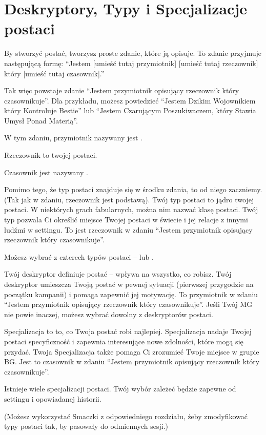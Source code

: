 \section{Deskryptory, Typy i Specjalizacje postaci}

By stworzyć postać, tworzysz proste zdanie, które ją opisuje. To zdanie przyjmuje następującą formę: “Jestem [umieść tutaj przymiotnik] [umieść tutaj rzeczownik] który [umieść tutaj czasownik].”

Tak więc powstaje zdanie “Jestem przymiotnik opisujący rzeczownik który czasownikuje”. Dla przykładu, możesz powiedzieć “Jestem Dzikim Wojownikiem który Kontroluje Bestie” lub “Jestem Czarującym Poszukiwaczem, który Stawia Umysł Ponad Materią”. 

W tym zdaniu, przymiotnik nazywany jest .

Rzeczownik to  twojej postaci.

Czasownik jest nazywany .

Pomimo tego, że typ postaci znajduje się w środku zdania, to od niego zaczniemy. (Tak jak w zdaniu, rzeczownik jest podstawą).
Twój typ postaci to jądro twojej postaci. W niektórych grach fabularnych, można nim nazwać klasę postaci. Twój typ pozwala Ci określić miejsce Twojej postaci w świecie i jej relacje z innymi ludźmi w settingu. To jest rzeczownik w zdaniu “Jestem przymiotnik opisujący rzeczownik który czasownikuje”.

Możesz wybrać z czterech typów postaci –  lub .

Twój deskryptor definiuje postać – wpływa na wszystko, co robisz. Twój deskryptor umieszcza Twoją postać w pewnej sytuacji (pierwszej przygodzie na początku kampanii) i pomaga zapewnić jej motywację. To przymiotnik w zdaniu “Jestem przymiotnik opisujący rzeczownik który czasownikuje”.
Jeśli Twój MG nie powie inaczej, możesz wybrać dowolny z deskryptorów postaci.

Specjalizacja to to, co Twoja postać robi najlepiej. Specjalizacja nadaje Twojej postaci specyficzność i zapewnia interesujące nowe zdolności, które mogą się przydać. Twoja Specjalizacja także pomaga Ci zrozumieć Twoje miejsce w grupie BG. Jest to czasownik w zdaniu “Jestem przymiotnik opisujący rzeczownik który czasownikuje”.

Istnieje wiele specjalizacji postaci. Twój wybór zależeć będzie zapewne od settingu i opowiadanej historii.

(Możesz wykorzystać Smaczki z odpowiedniego rozdziału, żeby zmodyfikować typy postaci tak, by pasowały do odmiennych sesji.)

